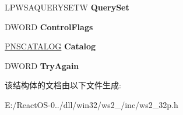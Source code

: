 \begin{DoxyCompactItemize}
\mbox{\label{struct___n_s_q_u_e_r_y_ad09e66867ec0b2bf24b5e9b7340a5ab0}} 
L\+P\+W\+S\+A\+Q\+U\+E\+R\+Y\+S\+E\+TW {\bfseries Query\+Set}
\item 
\mbox{\label{struct___n_s_q_u_e_r_y_a813bb20869ec0a8d162dbfd3661786eb}} 
D\+W\+O\+RD {\bfseries Control\+Flags}
\item 
\mbox{\label{struct___n_s_q_u_e_r_y_a173ab69e7430641fadc561758b3a8095}} 
\hyperlink{struct___n_s_c_a_t_a_l_o_g}{P\+N\+S\+C\+A\+T\+A\+L\+OG} {\bfseries Catalog}
\item 
\mbox{\label{struct___n_s_q_u_e_r_y_ab9b749f52787a1c161d7745fe132cfc8}} 
D\+W\+O\+RD {\bfseries Try\+Again}
\end{DoxyCompactItemize}


该结构体的文档由以下文件生成\+:\begin{DoxyCompactItemize}
\item 
E\+:/\+React\+O\+S-\/0../dll/win32/ws2\+\_/inc/ws2\+\_\+32p.\+h\end{DoxyCompactItemize}
